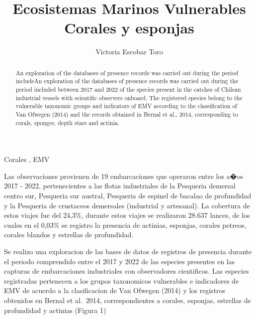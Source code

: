 \documentclass[
  super,
  preprint,
  3p]{elsarticle}
\begin{document}
\begin{frontmatter}
\title{Ecosistemas Marinos Vulnerables \\\large{Corales y esponjas} }
\author[1]{Victoria Escobar Toro%
%
}



        
\begin{abstract}
An exploration of the databases of presence records was carried out
during the period includeAn exploration of the databases of presence
records was carried out during the period included between 2017 and 2022
of the species present in the catches of Chilean industrial vessels with
scientific observers onboard. The registered species belong to the
vulnerable taxonomic groups and indicators of EMV according to the
classification of Van Ofwegen (2014) and the records obtained in Bernal
et al., 2014, corresponding to corals, sponges, depth stars and actinia.
\end{abstract}





\begin{keyword}
    Corales \sep 
    EMV
\end{keyword}
\end{frontmatter}
    \ifdefined\Shaded\renewenvironment{Shaded}{\begin{tcolorbox}[borderline west={3pt}{0pt}{shadecolor}, breakable, boxrule=0pt, frame hidden, interior hidden, enhanced, sharp corners]}{\end{tcolorbox}}\fi

Las observaciones provienen de 19 embarcaciones que operaron entre los
a�os 2017 - 2022, pertenecientes a las flotas industriales de la
Pesqueria demersal centro sur, Pesqueria sur austral, Pesqueria de
espinel de bacalao de profundidad y la Pesqueria de crustaceos
demersales (industrial y artesanal). La cobertura de estos viajes fue
del 24,3\%, durante estos viajes se realizaron 28.637 lances, de los
cuales en el 0,03\% se registro la presencia de actinias, esponjas,
corales petreos, corales blandos y estrellas de profundidad.

Se realizo una exploracion de las bases de datos de registros de
presencia durante el periodo comprendido entre el 2017 y 2022 de las
especies presentes en las capturas de embarcaciones industriales con
observadores cientificos. Las especies registradas pertenecen a los
grupos taxonomicos vulnerables e indicadores de EMV de acuerdo a la
clasificacion de Van Ofwegen (2014) y los registros obtenidos en Bernal
et al.~2014, correspondientes a corales, esponjas, estrellas de
profundidad y actinias (Figura 1)
\end{document}
